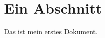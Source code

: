 \documentclass[a6paper]{scrartcl}
\begin{document}
\section{Ein Abschnitt}
Das ist mein erstes Dokument.
\end{document}

